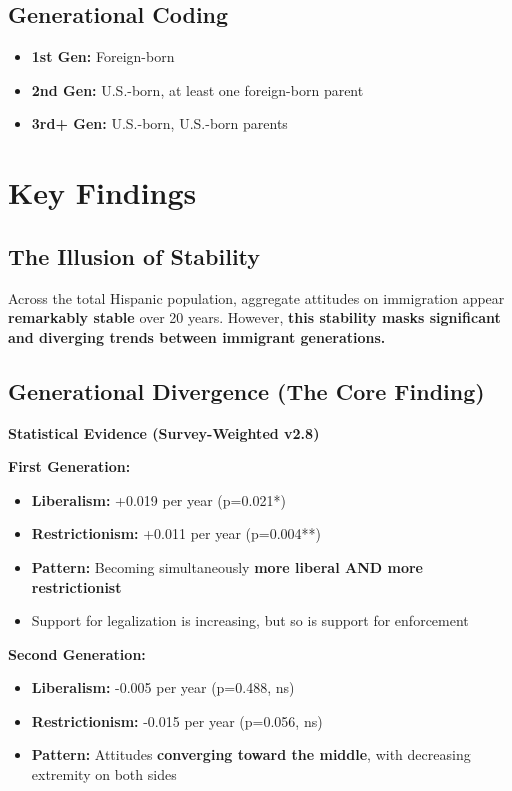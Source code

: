\documentclass[11pt,letterpaper]{article}
\begin{document}
\subsection{Generational Coding}
\begin{itemize}
    \item \textbf{1st Gen:} Foreign-born
    \item \textbf{2nd Gen:} U.S.-born, at least one foreign-born parent
    \item \textbf{3rd+ Gen:} U.S.-born, U.S.-born parents
\end{itemize}

\section{Key Findings}

\subsection{The Illusion of Stability}

Across the total Hispanic population, aggregate attitudes on immigration appear \textbf{remarkably stable} over 20 years. However, \textbf{this stability masks significant and diverging trends between immigrant generations.}

\subsection{Generational Divergence (The Core Finding)}

\textbf{Statistical Evidence (Survey-Weighted v2.8)}

\textbf{First Generation:}
\begin{itemize}
    \item \textbf{Liberalism:} +0.019 per year (p=0.021*)
    \item \textbf{Restrictionism:} +0.011 per year (p=0.004**)
    \item \textbf{Pattern:} Becoming simultaneously \textbf{more liberal AND more restrictionist}
    \item Support for legalization is increasing, but so is support for enforcement
\end{itemize}

\textbf{Second Generation:}
\begin{itemize}
    \item \textbf{Liberalism:} -0.005 per year (p=0.488, ns)
    \item \textbf{Restrictionism:} -0.015 per year (p=0.056, ns)
    \item \textbf{Pattern:} Attitudes \textbf{converging toward the middle}, with decreasing extremity on both sides
\end{itemize}
\end{document}
